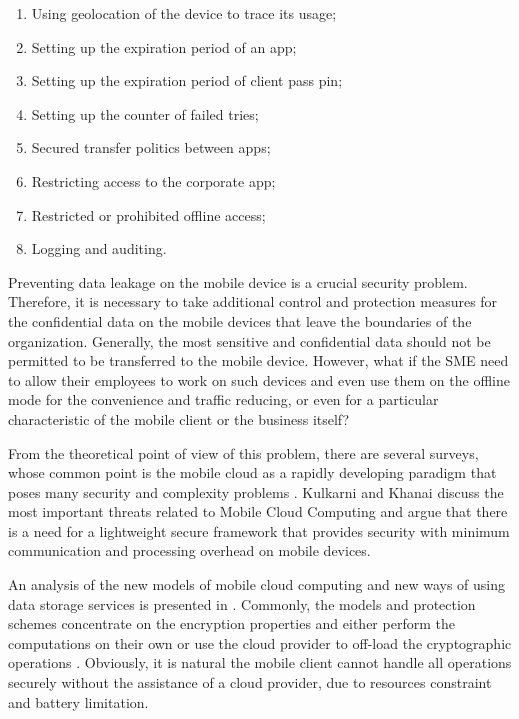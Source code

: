 \begin{enumerate}
	\item Using geolocation of the device to trace its usage;
	\item Setting up the expiration period of an app;
	\item Setting up the expiration period of client pass pin;
	\item Setting up the counter of failed tries;
	\item Secured transfer politics between apps;
	\item Restricting access to the corporate app;
	\item Restricted or prohibited offline access;
	\item Logging and auditing.
\end{enumerate}

Preventing data leakage on the mobile device is a crucial security problem. Therefore, it is necessary to take additional control and protection measures for the confidential data on the mobile devices that leave the boundaries of the organization. Generally, the most sensitive and confidential data should not be permitted to be transferred to the mobile device. However, what if the SME need to allow their employees to work on such devices and even use them on the offline mode for the convenience and traffic reducing, or even for a particular characteristic of the mobile client or the business itself?

From the theoretical point of view of this problem, there are several surveys, whose common point is the mobile cloud as a rapidly developing paradigm that poses many security and complexity problems \cite{khan2013towards, yovel2014, khan2014survey, khan2015cloud, mayrhofer2015architecture, chang2015design, xia2015tinman, kulkarni2015addressing, shila2016amcloud, heydari2016efficient}. Kulkarni and Khanai \cite{kulkarni2015addressing} discuss the most important threats related to Mobile Cloud Computing and argue that there is a need for a lightweight secure framework that provides security with minimum communication and processing overhead on mobile devices. 

An analysis of the new models of mobile cloud computing and new ways of using data storage services is presented in \cite{khan2015cloud, khan2013towards, mayrhofer2015architecture, chang2015design}. Commonly, the models and protection schemes concentrate on the encryption properties and either perform the computations on their own \cite{zhao2010trusted, yang2011provable} or use the cloud provider to off-load the cryptographic operations \cite{itani2010energy, ren2011lightweight}. Obviously, it is natural the mobile client cannot handle all operations securely without the assistance of a cloud provider, due to resources constraint and battery limitation.

